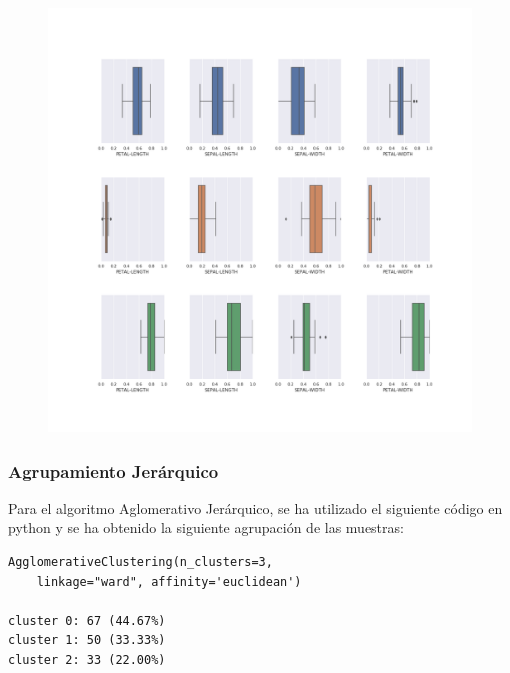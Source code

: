 \documentclass[spanish]{beamer}
\begin{document}
\begin{frame}
\begin{figure}[h]
\centering
\includegraphics[scale=0.24]{dani/boxplotK-MeansIRIS.png}
\end{figure}
\end{frame}

\begin{frame}[fragile]
\frametitle{Agrupamiento Jerárquico}
Para el algoritmo Aglomerativo Jerárquico, se ha utilizado el siguiente código en python y se ha obtenido la siguiente agrupación de las muestras:\break
\begin{lstlisting}
AgglomerativeClustering(n_clusters=3, 
	linkage="ward", affinity='euclidean')

cluster 0: 67 (44.67%)
cluster 1: 50 (33.33%)
cluster 2: 33 (22.00%)
\end{lstlisting}
\end{frame}
\end{document}

